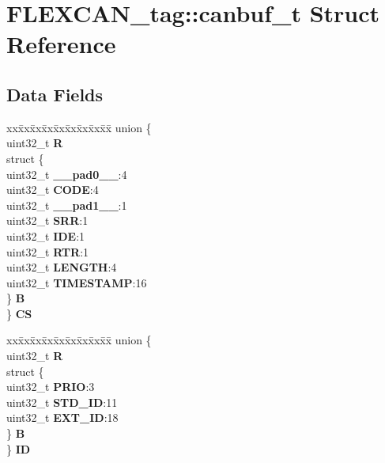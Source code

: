 \hypertarget{structFLEXCAN__tag_1_1canbuf__t}{}\section{F\+L\+E\+X\+C\+A\+N\+\_\+tag\+::canbuf\+\_\+t Struct Reference}
\label{structFLEXCAN__tag_1_1canbuf__t}
\subsection*{Data Fields}
\begin{DoxyCompactItemize}
\item 
\mbox{\label{structFLEXCAN__tag_1_1canbuf__t_a4384910574ec936df059694fe354f5d1}} 
\begin{tabbing}
xx\=xx\=xx\=xx\=xx\=xx\=xx\=xx\=xx\=\kill
union \{\\
\>uint32\_t {\bfseries R}\\
\>struct \{\\
\>\>uint32\_t {\bfseries \_\_pad0\_\_}:4\\
\>\>uint32\_t {\bfseries CODE}:4\\
\>\>uint32\_t {\bfseries \_\_pad1\_\_}:1\\
\>\>uint32\_t {\bfseries SRR}:1\\
\>\>uint32\_t {\bfseries IDE}:1\\
\>\>uint32\_t {\bfseries RTR}:1\\
\>\>uint32\_t {\bfseries LENGTH}:4\\
\>\>uint32\_t {\bfseries TIMESTAMP}:16\\
\>\} {\bfseries B}\\
\} {\bfseries CS}\\

\end{tabbing}\item 
\mbox{\label{structFLEXCAN__tag_1_1canbuf__t_af4bb565fa00c3dabe84caf9d36063649}} 
\begin{tabbing}
xx\=xx\=xx\=xx\=xx\=xx\=xx\=xx\=xx\=\kill
union \{\\
\>uint32\_t {\bfseries R}\\
\>struct \{\\
\>\>uint32\_t {\bfseries PRIO}:3\\
\>\>uint32\_t {\bfseries STD\_ID}:11\\
\>\>uint32\_t {\bfseries EXT\_ID}:18\\
\>\} {\bfseries B}\\
\} {\bfseries ID}\\


\end{tabbing}
\end{DoxyCompactItemize}
